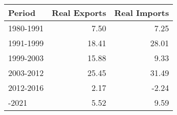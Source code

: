 
\begin{tabular}{lrr}
\toprule
Period & Real Exports & Real Imports\\
\midrule
1980-1991 & 7.50 & 7.25\\
1991-1999 & 18.41 & 28.01\\
1999-2003 & 15.88 & 9.33\\
2003-2012 & 25.45 & 31.49\\
2012-2016 & 2.17 & -2.24\\
\addlinespace
2016-2021 & 5.52 & 9.59\\
\bottomrule
\end{tabular}
